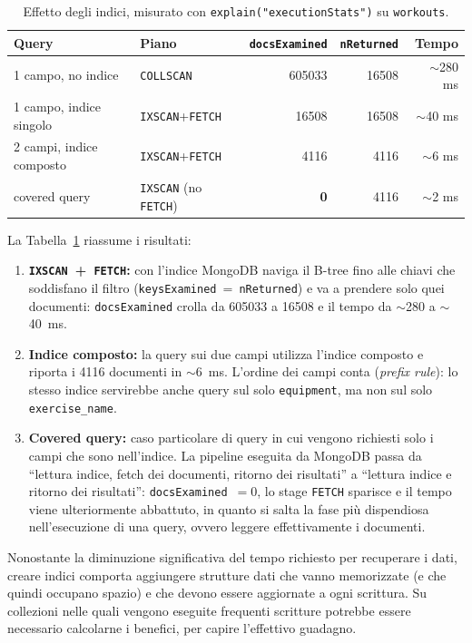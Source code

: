 \documentclass{article}
\begin{document}
\begin{table}[H]
\centering
\caption{Effetto degli indici, misurato con \texttt{explain("executionStats")} su
\texttt{workouts}.}
\label{tab:index}
\begin{tabular}{llrrr}
\toprule
Query & Piano & \texttt{docsExamined} & \texttt{nReturned} & Tempo \\
\midrule
1 campo, no indice        & \texttt{COLLSCAN}        & \num{605033} & \num{16508} & $\sim$280 ms \\
1 campo, indice singolo   & \texttt{IXSCAN}+\texttt{FETCH} & \num{16508} & \num{16508} & $\sim$40 ms \\
2 campi, indice composto  & \texttt{IXSCAN}+\texttt{FETCH} & \num{4116}  & \num{4116}  & $\sim$6 ms \\
covered query             & \texttt{IXSCAN} (no \texttt{FETCH}) & \textbf{0} & \num{4116} & $\sim$2 ms \\
\bottomrule
\end{tabular}
\end{table}

La Tabella~\ref{tab:index} riassume i risultati:
\begin{enumerate}
    \item \textbf{\texttt{IXSCAN}~+~\texttt{FETCH}:} con l'indice MongoDB naviga il
    B-tree fino alle chiavi che soddisfano il filtro
    (\texttt{keysExamined}~=~\texttt{nReturned}) e va a prendere solo quei
    documenti: \texttt{docsExamined} crolla da \num{605033} a \num{16508} e il
    tempo da $\sim$280 a $\sim$40~ms.
    \item \textbf{Indice composto:} la query sui due campi utilizza l'indice
    composto e riporta i \num{4116} documenti in $\sim$6~ms. L'ordine dei campi
    conta (\emph{prefix rule}): lo stesso indice servirebbe anche query sul solo
    \texttt{equipment}, ma non sul solo \texttt{exercise\_name}.
    \item \textbf{Covered query:} caso particolare di query in cui vengono
    richiesti solo i campi che sono nell'indice. La pipeline eseguita da MongoDB
    passa da ``lettura indice, fetch dei documenti, ritorno dei risultati'' a
    ``lettura indice e ritorno dei risultati'': \texttt{docsExamined}~$=0$, lo
    stage \texttt{FETCH} sparisce e il tempo viene ulteriormente abbattuto, in
    quanto si salta la fase più dispendiosa nell'esecuzione di una query, ovvero
    leggere effettivamente i documenti.
\end{enumerate}

Nonostante la diminuzione significativa del tempo richiesto per recuperare i dati,
creare indici comporta aggiungere strutture dati che vanno memorizzate (e che
quindi occupano spazio) e che devono essere aggiornate a ogni scrittura. Su
collezioni nelle quali vengono eseguite frequenti scritture potrebbe essere
necessario calcolarne i benefici, per capire l'effettivo guadagno.
\end{document}
